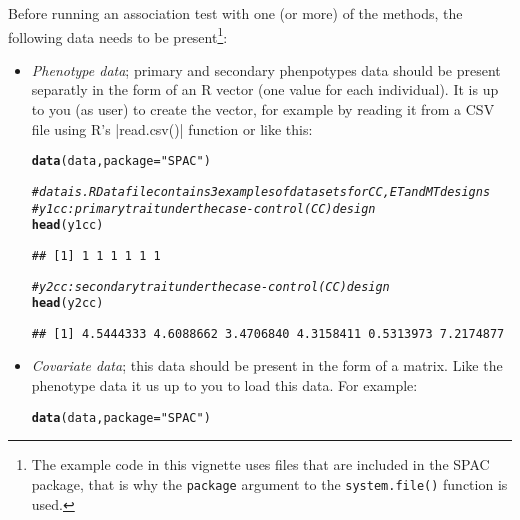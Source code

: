 \documentclass{article}\usepackage[]{graphicx}\usepackage[]{color}
\makeatletter
\newcommand{\hlstr}[1]{\textcolor[rgb]{0.192,0.494,0.8}{#1}}%
\newcommand{\hlcom}[1]{\textcolor[rgb]{0.678,0.584,0.686}{\textit{#1}}}%
\newcommand{\hlstd}[1]{\textcolor[rgb]{0.345,0.345,0.345}{#1}}%
\newcommand{\hlkwc}[1]{\textcolor[rgb]{0.333,0.667,0.333}{#1}}%
\newcommand{\hlkwd}[1]{\textcolor[rgb]{0.737,0.353,0.396}{\textbf{#1}}}%
\newenvironment{kframe}{%
 \def\at@end@of@kframe{}%
 \ifinner\ifhmode%
  \def\at@end@of@kframe{\end{minipage}}%
  \begin{minipage}{\columnwidth}%
 \fi\fi%
 \def\FrameCommand##1{\hskip\@totalleftmargin \hskip-\fboxsep
 \colorbox{shadecolor}{##1}\hskip-\fboxsep
     \hskip-\linewidth \hskip-\@totalleftmargin \hskip\columnwidth}%
 \MakeFramed {\advance\hsize-\width
   \@totalleftmargin\z@ \linewidth\hsize
   \@setminipage}}%
 {\par\unskip\endMakeFramed%
 \at@end@of@kframe}
\newenvironment{knitrout}{}{} %
\makeatother
\begin{document}
Before running an association test with one (or more) of the methods,
the following data needs to be present\footnote{The example code in
  this vignette uses files that are included in the SPAC
  package, that is why the \lstinline{package} argument to the
  \lstinline{system.file()} function is used.}:
\begin{itemize}
\item \emph{Phenotype data}; primary and secondary phenpotypes data should be present separatly in the form of
  an R vector (one value for each individual). It is up to you (as user)
  to create the vector, for example by reading it from a CSV file using R's
  |read.csv()| function or like this:
\begin{knitrout}
\color{fgcolor}\begin{kframe}
\begin{alltt}

   \hlkwd{data}\hlstd{(data,}\hlkwc{package}\hlstd{=}\hlstr{"SPAC"}\hlstd{)}
   
\hlcom{# data is .RData file contains 3 examples of data sets for CC, ET and MT designs}
\hlcom{# y1cc: primary trait under the case-control (CC) design}
  \hlkwd{head}\hlstd{(y1cc)}
\end{alltt}
\begin{verbatim}
## [1] 1 1 1 1 1 1
\end{verbatim}
\begin{alltt}
\hlcom{# y2cc: secondary trait under the case-control (CC) design}
  \hlkwd{head}\hlstd{(y2cc)}
\end{alltt}
\begin{verbatim}
## [1] 4.5444333 4.6088662 3.4706840 4.3158411 0.5313973 7.2174877
\end{verbatim}
\end{kframe}
\end{knitrout}
\item \emph{Covariate data}; this data should be present in the form
  of a matrix. Like the phenotype data it us up to you to load this
  data. For example:
\begin{knitrout}
\color{fgcolor}\begin{kframe}
\begin{alltt}

   \hlkwd{data}\hlstd{(data,}\hlkwc{package}\hlstd{=}\hlstr{"SPAC"}\hlstd{)}
   

\end{alltt}
\end{kframe}
\end{knitrout}
\end{itemize}
\end{document}

